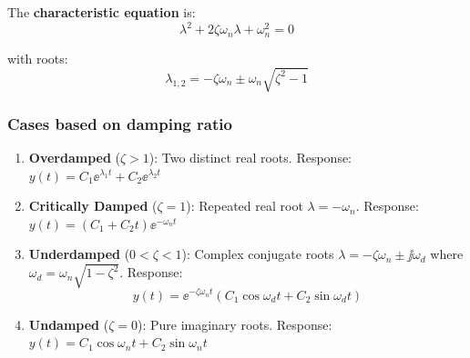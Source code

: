 The \textbf{characteristic equation} is:
\begin{equation}
\lambda^2 + 2\zeta\omega_n\lambda + \omega_n^2 = 0
\end{equation}

with roots:
\begin{equation}
\lambda_{1,2} = -\zeta\omega_n \pm \omega_n\sqrt{\zeta^2 - 1}
\end{equation}

\subsubsection{Cases based on damping ratio}

\begin{enumerate}
    \item \textbf{Overdamped} ($\zeta > 1$): Two distinct real roots. Response: $y(t) = C_1\ee^{\lambda_1 t} + C_2\ee^{\lambda_2 t}$

    \item \textbf{Critically Damped} ($\zeta = 1$): Repeated real root $\lambda = -\omega_n$. Response: $y(t) = (C_1 + C_2 t)\ee^{-\omega_n t}$

    \item \textbf{Underdamped} ($0 < \zeta < 1$): Complex conjugate roots $\lambda = -\zeta\omega_n \pm \jj\omega_d$ where $\omega_d = \omega_n\sqrt{1-\zeta^2}$. Response:
    \begin{equation}
    y(t) = \ee^{-\zeta\omega_n t}(C_1\cos\omega_d t + C_2\sin\omega_d t)
    \end{equation}

    \item \textbf{Undamped} ($\zeta = 0$): Pure imaginary roots. Response: $y(t) = C_1\cos\omega_n t + C_2\sin\omega_n t$
\end{enumerate}

